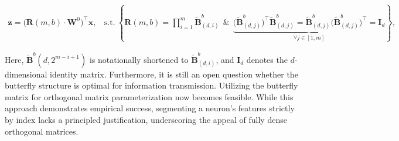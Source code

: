 \begin{equation}
    \begin{aligned}\nonumber
    \bm{z}=\big(\bm{R}(m,b)\cdot\bm{W}^0\big)^\top\bm{x},~~~~\text{s.t.}~\left\{\bm{R}(m,b)=\prod_{i=1}^m \tilde{\bm{B}}^b_{(d,i)}~~\&~~\underbrace{\big(\tilde{\bm{B}}^b_{(d,j)}\big)^\top\tilde{\bm{B}}^b_{(d,j)}=\tilde{\bm{B}}^b_{(d,j)}\big(\tilde{\bm{B}}^b_{(d,j)}\big)^\top\!=\bm{I}_d}_{\forall j\in [1, m]}\right\},
    \end{aligned}
\end{equation}

Here, $\tilde{\bm{B}}^b(d,2^{m - i+1})$ is notationally shortened to $\tilde{\bm{B}}^b_{(d,i)}$, and $\bm{I}_d$ denotes the $d$-dimensional identity matrix. Furthermore, it is still an open question whether the butterfly structure is optimal for information transmission. Utilizing the butterfly matrix for orthogonal matrix parameterization now becomes feasible. While this approach demonstrates empirical success, segmenting a neuron's features strictly by index lacks a principled justification, underscoring the appeal of fully dense orthogonal matrices. 
